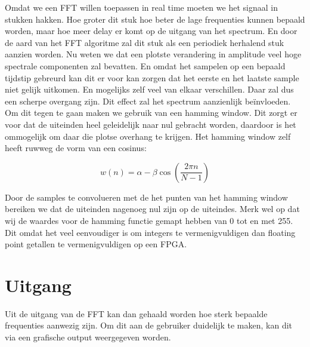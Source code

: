 	\par Omdat we een FFT willen toepassen in real time moeten we het signaal in stukken hakken. Hoe groter dit stuk hoe beter de lage frequenties kunnen bepaald worden, maar hoe meer delay er komt op de uitgang van het spectrum. En door de aard van het FFT algoritme zal dit stuk als een periodiek herhalend stuk aanzien worden. Nu weten we dat een plotste verandering in amplitude veel hoge spectrale componenten zal bevatten. En omdat het sampelen op een bepaald tijdstip gebreurd kan dit er voor kan zorgen dat het eerste en het laatste sample niet gelijk uitkomen. En mogelijks zelf veel van elkaar verschillen. Daar zal dus een scherpe overgang zijn. Dit effect zal het spectrum aanzienlijk be\"invloeden. Om dit tegen te gaan maken we gebruik van een hamming window. Dit zorgt er voor dat de uiteinden heel geleidelijk naar nul gebracht worden, daardoor is het ommogelijk om daar die plotse overhang te krijgen. Het hamming window zelf heeft ruwweg de vorm van een cosinus:

		\begin{equation}
		 w(n) = \alpha - \beta \cos \left( \frac{2 \pi n}{N-1} \right)
		\end{equation}

	\par Door de samples te convolueren met de het punten van het hamming window bereiken we dat de uiteinden nagenoeg nul zijn op de uiteindes. Merk wel op dat wij de waardes voor de hamming functie gemapt hebben van 0 tot en met 255. Dit omdat het veel eenvoudiger is om integers te vermenigvuldigen dan floating point getallen te vermenigvuldigen op een FPGA.

\section{Uitgang}

	\par Uit de uitgang van de FFT kan dan gehaald worden hoe sterk bepaalde frequenties aanwezig zijn.	Om dit aan de gebruiker duidelijk te maken, kan dit via een grafische output weergegeven worden.